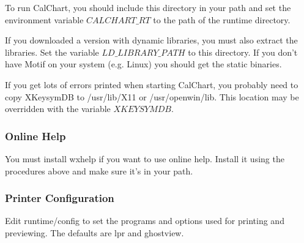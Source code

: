 To run CalChart, you should include this directory in your path and set
the environment variable $CALCHART\_RT$ to the path of the runtime
directory.

If you downloaded a version with dynamic libraries, you must also
extract the libraries.  Set the variable $LD\_LIBRARY\_PATH$ to this
directory.  If you don't have Motif on your system (e.g. Linux) you
should get the static binaries.

If you get lots of errors printed when starting CalChart, you probably
need to copy XKeysymDB to /usr/lib/X11 or /usr/openwin/lib.  This
location may be overridden with the variable $XKEYSYMDB$.

\subsubsection{Online Help}\label{unixhelp}

You must install wxhelp if you want to use online help.  Install it using
the procedures above and make sure it's in your path.

\subsubsection{Printer Configuration}\label{unixprinter}

Edit runtime/config to set the programs and options used for printing
and previewing.  The defaults are lpr and ghostview.
